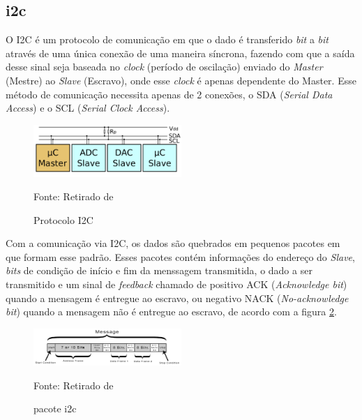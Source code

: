 \documentclass[../../layout.tex]{subfiles}
\begin{document}
\subsection{i2c}
\hspace*{3em}O I2C é um protocolo de comunicação em que o dado é transferido \emph{bit} a \emph{bit} através de uma única conexão de uma maneira síncrona, fazendo com que a saída desse sinal seja baseada no \emph{clock} (período de oscilação) enviado do \emph{Master} (Mestre) ao \emph{Slave} (Escravo), onde esse \emph{clock} é apenas dependente do Master. Esse método de comunicação necessita apenas de 2 conexões, o SDA (\emph{Serial Data Access}) e o SCL (\emph{Serial Clock Access}).

\begin{figure}[H]
\centering
\caption{Protocolo I2C}
\includegraphics[width=0.5\textwidth]{assets/static/img/i2c.jpg}
\label{fig:i2c}

\begin{minipage}{0.5\textwidth}
\raggedright \footnotesize Fonte: Retirado de  
\end{minipage}
\end{figure}

\hspace*{3em}Com a comunicação via I2C, os dados são quebrados em pequenos pacotes em que formam esse padrão. Esses pacotes contém informações do endereço do \emph{Slave}, \emph{bits} de condição de início e fim da menssagem transmitida, o dado a ser transmitido e um sinal de \emph{feedback} chamado de positivo ACK (\emph{Acknowledge bit}) quando a mensagem é entregue ao escravo, ou negativo NACK (\emph{No-acknowledge bit}) quando a mensagem não é entregue ao escravo, de acordo com a figura \ref{fig:i2cstructure}.

\begin{figure}[H]
\centering
\caption{pacote i2c}
\includegraphics[width=0.5\textwidth]{assets/static/img/i2c_structure.jpg}
\label{fig:i2cstructure}

\begin{minipage}{0.5\textwidth}
\raggedright \footnotesize Fonte: Retirado de \cite{i2c_structure} 
\end{minipage}
\end{figure}
\end{document}
